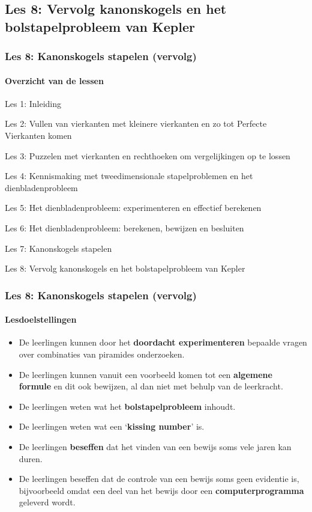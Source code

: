 \documentclass[dutch]{beamer}
\begin{document}
\subsection{Les 8: Vervolg kanonskogels en het bolstapelprobleem van Kepler}
\begin{frame}
\frametitle{Les 8: Kanonskogels stapelen {\small (vervolg)}}
\framesubtitle{Overzicht van de lessen}
\begin{list}{\quad}{}
\item Les 1: Inleiding
\item Les 2: Vullen van vierkanten met kleinere vierkanten en zo tot Perfecte Vierkanten komen
\item Les 3: Puzzelen met vierkanten en rechthoeken om vergelijkingen op te lossen
\item Les 4: Kennismaking met tweedimensionale stapelproblemen en het dienbladenprobleem 
\item Les 5: Het dienbladenprobleem: experimenteren en effectief berekenen
\item Les 6: Het dienbladenprobleem: berekenen, bewijzen en besluiten
\item Les 7: Kanonskogels stapelen
\item {\color{blue}Les 8: Vervolg kanonskogels en het bolstapelprobleem van Kepler}
\end{list}
\end{frame}

\begin{frame}
\frametitle{Les 8: Kanonskogels stapelen {\small (vervolg)}}
\framesubtitle{Lesdoelstellingen}
\begin{itemize}
\item De leerlingen kunnen door het \textbf{doordacht experimenteren} bepaalde vragen over combinaties van piramides onderzoeken.
\item De leerlingen kunnen vanuit een voorbeeld komen tot een \textbf{algemene formule} en dit ook bewijzen, al dan niet met behulp van de leerkracht.
\item De leerlingen weten wat het \textbf{bolstapelprobleem} inhoudt.
\item De leerlingen weten wat een \textquoteleft \textbf{kissing number}' is.
\item De leerlingen \textbf{beseffen} dat het vinden van een bewijs soms vele jaren kan duren.
\item De leerlingen beseffen dat de controle van een bewijs soms geen evidentie is, bijvoorbeeld omdat een deel van het bewijs door een \textbf{computerprogramma} geleverd wordt.

\end{itemize}
\end{frame}
\end{document}
